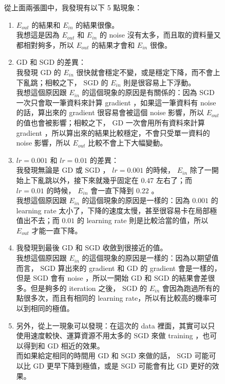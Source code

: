 \documentclass[12pt,a4paper]{article}
\begin{document}
\begin{figure}[h]
從上面兩張圖中，我發現有以下 5 點現象：
\begin{enumerate}
	\item $E_{out}$ 的結果和 $E_{in}$ 的結果很像。\\
	我想這是因為 $E_{out}$ 和 $E_{in}$ 的 noise 沒有太多，而且取的資料量又都相對夠多，所以 $E_{out}$ 的結果才會和 $E_{in}$ 很像。
	\item GD 和 SGD 的差異： \\
	我發現 GD 的 $E_{in}$ 很快就會穩定不變，或是穩定下降，而不會上下亂跳；相較之下， SGD 的 $E_{in}$ 則是很容易上下浮動。 \\
	我想這個原因跟 $E_{in}$ 的這個現象的原因是有關係的：因為 SGD 一次只會取一筆資料來計算 gradient ，如果這一筆資料有 noise 的話，算出來的 gradient 很容易會被這個 noise 影響，所以 $E_{out}$ 的值也會被影響；相較之下， GD 一次會用所有資料來計算 gradient ，所以算出來的結果比較穩定，不會只受單一資料的 noise 影響，所以 $E_{out}$ 比較不會上下大幅變動。
	\item $lr = 0.001$ 和 $lr = 0.01$ 的差異： \\
	我發現無論是 GD 或 SGD ， $lr = 0.001$ 的時候， $E_{in}$ 除了一開始上下亂跳以外，接下來就幾乎固定在 $0.47$ 左右了；而 $lr = 0.01$ 的時候， $E_{in}$ 會一直下降到 $0.22$ 。 \\
	我想這個原因跟 $E_{in}$ 的這個現象的原因是一樣的：因為 $0.001$ 的 learning rate 太小了，下降的速度太慢，甚至很容易卡在局部極值出不去；而 $0.01$ 的 learning rate 則是比較洽當的值，所以 $E_{out}$ 才能一直下降。
	\item 我發現到最後 GD 和 SGD 收斂到很接近的值。\\
	我想這個原因跟 $E_{in}$ 的這個現象的原因是一樣的：因為以期望值而言， SGD 算出來的 gradient 和 GD 的 gradient 會是一樣的，但是 SGD 會有 noise ，所以一開始 GD 和 SGD 的結果會差很多。但是夠多的 iteration 之後， SGD 的 $E_{in}$ 會因為跑過所有的點很多次，而且有相同的 learning rate，所以有比較高的機率可以到相同的極值。
	\item 另外，從上一現象可以發現：在這次的 data 裡面，其實可以只使用速度較快、運算資源不用太多的 SGD 來做 training ，也可以得到和 GD 相近的效果。\\
	而如果給定相同的時間用 GD 和 SGD 來做的話， SGD 可能可以比 GD 更早下降到極值，或是 SGD 可能會有比 GD 更好的效果。
\end{enumerate}
\end{figure}
\end{document}
